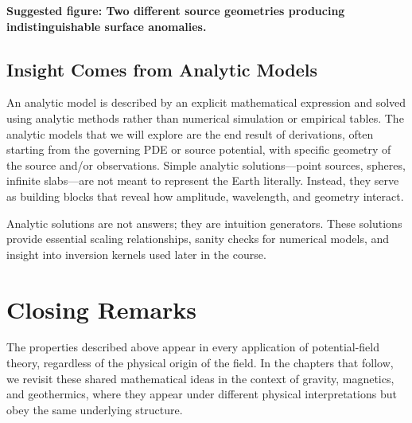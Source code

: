 \textbf{Suggested figure:
Two different source geometries producing indistinguishable surface anomalies.}

\subsection{Insight Comes from Analytic Models}

An analytic model is described by an explicit mathematical expression and solved using analytic methods rather than numerical simulation or empirical tables.  The analytic models that we will explore are the end result of derivations, often starting from the governing PDE or source potential, with specific geometry of the source and/or observations.  Simple analytic solutions---point sources, spheres, infinite slabs---are not meant to represent the Earth literally. Instead, they serve as building blocks that reveal how amplitude, wavelength, and geometry interact.

Analytic solutions are not answers; they are intuition generators.  These solutions provide essential scaling relationships, sanity checks for numerical models, and insight into inversion kernels used later in the course.

\section{Closing Remarks}
The properties described above appear in every application of potential-field theory, regardless of the physical origin of the field. In the chapters that follow, we revisit these shared mathematical ideas in the context of gravity, magnetics, and geothermics, where they appear under different physical interpretations but obey the same underlying structure.

%
%



